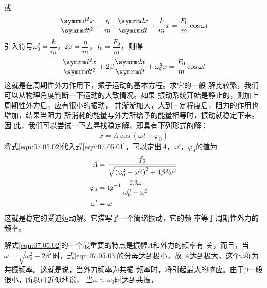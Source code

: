 \clearpage\noindent
或\vspace{-2.5em}
\begin{equation*}
  \frac { \dif ^ { 2 } x } { \dif t ^ { 2 } } + \frac { \eta } { m } \cdot \frac { \dif x } { \dif t } + \frac { k } { m } x = \frac { F _ { 0 } } { m } \cos \omega t
\end{equation*}
引入符号$ \omega _ { 0 } ^ { 2 } = \dfrac { k } { m } $，$ 2 \beta = \dfrac { \eta } { m } $，$ f _ { 0 } = \dfrac { F _ { 0 } } { m } $，则得
\begin{equation}\label{eqn:07.05.01}
  \frac { \dif ^ { 2 } x } { \dif t ^ { 2 } } + 2 \beta \frac { \dif x } { \dif t } + \omega _ { 0 } ^ { 2 } x = \frac { F _ { 0 } } { m } \cos \omega t
\end{equation}
这就是在周期性外力作用下，振子运动的基本方程。求它的一般
解比较繁，我们可以从物理角度判断一下运动的大致情况。如果
振动系统开始是静止的，则加上周期性外力后，应有很小的振动，
并渐渐加大，大到一定程度后，阻力的作用也增加，结果当阻力
所消耗的能量与外力所给予的能量相等时，振动就稳定下来。因
此，我们可以尝试一下去寻找稳定解，即具有下列形式的解：
\begin{equation}\label{eqn:07.05.02}
  x = A \cos \left( \omega t + \varphi _ { 0 } \right)
\end{equation}
将式\eqref{eqn:07.05.02}代入式\eqref{eqn:07.05.01}，可以定出$ A $，$  \omega ' $，$ \varphi_{ 0 } $的值为
\begin{align}
  A &= \frac { f _ { 0 } } { \sqrt { \left( \omega_{ 0 } ^ { 2 } - \omega ^ { 2 } \right) ^ { 2 } + 4 \beta ^ { 2 } \omega ^ { 2 } }} \label{eqn:07.05.03} \\
  \varphi _ { 0 } &= \operatorname{tg} ^ { - 1 } \frac { 2 \beta \omega } { \omega_{ 0 } ^ { 2 } - \omega ^ { 2 } } \label{eqn:07.05.04} \\
  \omega ' &= \omega \label{eqn:07.05.05}
\end{align}
这就是稳定的受迫运动解。它描写了一个简谐振动，它的频
率等于周期性外力的频率。

解式\eqref{eqn:07.05.02}的一个最重要的特点是振幅$ A $和外力的频率有
关，而且，当$ \omega = \sqrt { \omega _ { 0 } ^ { 2 } - 2 \beta ^ { 2 } } $时，式\eqref{eqn:07.05.03}的分母达到极小，故
$ A $达到极大，这个$ \omega $称为共振频率。这就是说，当外力频率为共振
频率时，将引起最大的响应。由于$ \beta $一般很小，所以可近似地说，
当$ \omega \approx \omega _ { 0 } $时达到共振。

